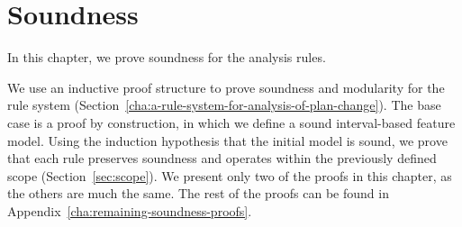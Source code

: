 \chapter{Soundness}
\label{cha:soundness}


In this chapter, we prove soundness for the analysis rules.



We use an inductive proof structure to prove soundness and modularity for the rule system (Section~\vref{cha:a-rule-system-for-analysis-of-plan-change}). The base case is a proof by construction, in which we define a sound interval-based feature model. Using the induction hypothesis that the initial model is sound, we prove that each rule preserves soundness and operates within the previously defined scope (Section~\vref{sec:scope}). We present only two of the proofs in this chapter, as the others are much the same. The rest of the proofs can be found in Appendix~\vref{cha:remaining-soundness-proofs}.








